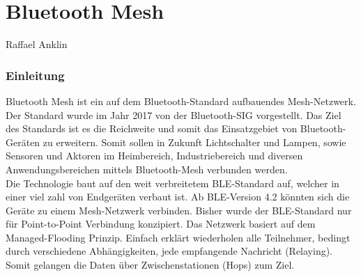 \vspace*{4cm}
\part{Bluetooth Mesh}\label{part:BluetoothMesh}
Raffael Anklin
\vspace*{\fill}
\clearpage

\section{Einleitung}\label{sec:EinleitungBluetooth}


Bluetooth Mesh ist ein auf dem Bluetooth-Standard aufbauendes Mesh-Netzwerk. Der Standard wurde im Jahr 2017 von der Bluetooth-SIG vorgestellt. Das Ziel des Standards ist es die Reichweite und somit das Einsatzgebiet von Bluetooth-Geräten zu erweitern. Somit sollen in Zukunft Lichtschalter und Lampen, sowie Sensoren und Aktoren im Heimbereich, Industriebereich und diversen Anwendungsbereichen mittels Bluetooth-Mesh verbunden werden.  \\


Die Technologie baut auf den weit verbreitetem BLE-Standard auf, welcher in einer viel zahl von Endgeräten verbaut ist. Ab BLE-Version 4.2 könnten sich die Geräte zu einem Mesh-Netzwerk verbinden. Bisher wurde der BLE-Standard nur für Point-to-Point Verbindung konzipiert. Das Netzwerk basiert auf dem Managed-Flooding Prinzip. Einfach erklärt wiederholen alle Teilnehmer, bedingt durch verschiedene Abhängigkeiten, jede empfangende Nachricht (Relaying). Somit gelangen die Daten über Zwischenstationen (Hops) zum Ziel. 









